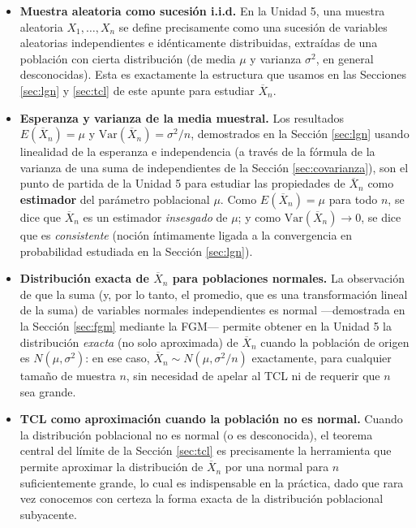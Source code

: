 \documentclass[11pt,a4paper]{article}
\theoremstyle{plain}
\theoremstyle{definition}
\theoremstyle{remark}
\begin{document}
\begin{itemize}
\item \textbf{Muestra aleatoria como sucesión i.i.d.} En la Unidad 5, una muestra aleatoria $X_1,\dots,X_n$ se define precisamente como una sucesión de variables aleatorias independientes e idénticamente distribuidas, extraídas de una población con cierta distribución (de media $\mu$ y varianza $\sigma^2$, en general desconocidas). Esta es exactamente la estructura que usamos en las Secciones \ref{sec:lgn} y \ref{sec:tcl} de este apunte para estudiar $\overline{X}_n$.

\item \textbf{Esperanza y varianza de la media muestral.} Los resultados $E(\overline{X}_n)=\mu$ y $\text{Var}(\overline{X}_n)=\sigma^2/n$, demostrados en la Sección \ref{sec:lgn} usando linealidad de la esperanza e independencia (a través de la fórmula de la varianza de una suma de independientes de la Sección \ref{sec:covarianza}), son el punto de partida de la Unidad 5 para estudiar las propiedades de $\overline{X}_n$ como \textbf{estimador} del parámetro poblacional $\mu$. Como $E(\overline{X}_n)=\mu$ para todo $n$, se dice que $\overline{X}_n$ es un estimador \emph{insesgado} de $\mu$; y como $\text{Var}(\overline{X}_n)\to0$, se dice que es \emph{consistente} (noción íntimamente ligada a la convergencia en probabilidad estudiada en la Sección \ref{sec:lgn}).

\item \textbf{Distribución exacta de $\overline{X}_n$ para poblaciones normales.} La observación de que la suma (y, por lo tanto, el promedio, que es una transformación lineal de la suma) de variables normales independientes es normal —demostrada en la Sección \ref{sec:fgm} mediante la FGM— permite obtener en la Unidad 5 la distribución \emph{exacta} (no solo aproximada) de $\overline{X}_n$ cuando la población de origen es $N(\mu,\sigma^2)$: en ese caso, $\overline{X}_n \sim N(\mu,\sigma^2/n)$ exactamente, para cualquier tamaño de muestra $n$, sin necesidad de apelar al TCL ni de requerir que $n$ sea grande.

\item \textbf{TCL como aproximación cuando la población no es normal.} Cuando la distribución poblacional no es normal (o es desconocida), el teorema central del límite de la Sección \ref{sec:tcl} es precisamente la herramienta que permite aproximar la distribución de $\overline{X}_n$ por una normal para $n$ suficientemente grande, lo cual es indispensable en la práctica, dado que rara vez conocemos con certeza la forma exacta de la distribución poblacional subyacente.


\end{itemize}
\end{document}
